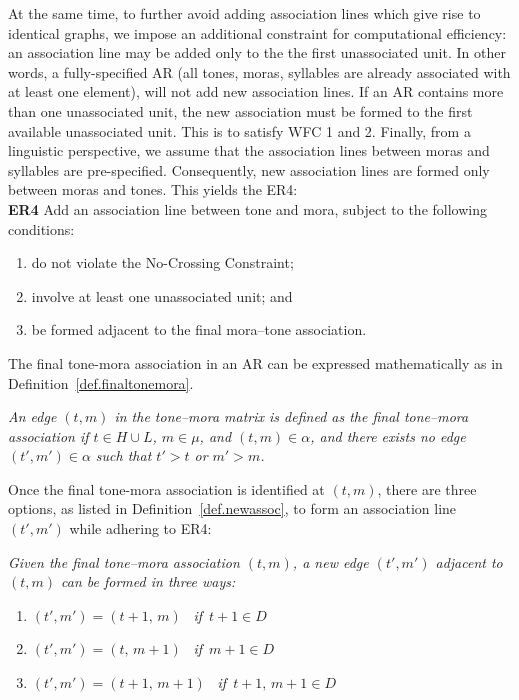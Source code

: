 At the same time, to further avoid adding association lines which give
rise to identical graphs, we impose an additional constraint for
computational efficiency: an association line may be added only to the
the first unassociated unit. In other words, a fully-specified AR (all tones, moras, syllables are already associated with at least one element), will not add new association lines. If an AR contains more than one unassociated unit,
the new association must be formed to the first available unassociated
unit. This is to satisfy WFC 1 and 2. Finally, from a linguistic
perspective, we assume that the association lines between moras and
syllables are pre-specified. Consequently, new association lines are
formed only between moras and tones. This yields the ER4:\\

\noindent \textbf{ER4} Add an association line between tone and mora, subject to the following conditions:
	\begin{enumerate}[label = \alph*.]
		\setlength\itemsep{0em}
		\setlength\parskip{0em}
		\setlength{\parindent}{1em}
		\item do not violate the No-Crossing Constraint;
		\item involve at least one unassociated unit; and
		\item be formed adjacent to the final mora--tone association.\label{er4}
	\end{enumerate}

The final tone-mora association in an AR can be expressed 
mathematically as in Definition~\ref{def.finaltonemora}.

\begin{definition}
	\label{def.finaltonemora}
	\textit{An edge $(t,m)$ in the tone--mora matrix is defined as the final tone--mora association if $t \in H \cup L$, $m \in 
		\mu$, and $(t,m) \in \alpha$, and there exists no edge $(t',m') \in
		\alpha$ such that $t' > t$ or $m' > m$.}
\end{definition} 

Once the final tone-mora association is identified at $(t, m)$, there are 
three options, as listed in Definition~\ref{def.newassoc}, to form an association line $(t', m')$ while adhering to ER4:


\begin{definition}
	\textit{
		Given the final tone--mora association $(t,m)$, a new edge $(t',m')$
		adjacent to $(t,m)$ can be formed in three ways:}
	\begin{enumerate}[label = \alph*.]
		\setlength\itemsep{0em} \setlength\parskip{0em}
		\item $(t', m') = (t{+}1,\, m)$ \qquad\, \textit{if} $\, t{+}1 \in D$  
		\item $(t', m') = (t,\, m{+}1)$ \qquad\, \textit{if} $\, m{+}1 \in D$  
		\item $(t', m') = (t{+}1,\, m{+}1)$ \quad\, \textit{if} $ \, t{+}1,\, m{+}1 \in D$
	\end{enumerate}
	\label{def.newassoc}
\end{definition} 


